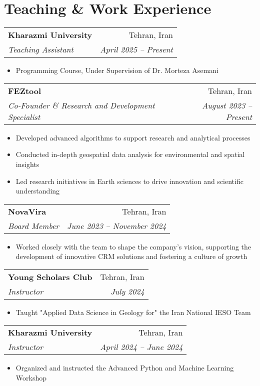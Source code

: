 \documentclass[letterpaper,11pt]{article}
\makeatletter
\newcommand{\resitem}[1]{\item #1 \vspace{-2pt}}
\newcommand{\ressubheading}[4]{
	\begin{tabular*}{6.5in}{l@{\cftdotfill{\cftsecdotsep}\extracolsep{\fill}}r}
		\textbf{#1} & #2 \\
		\textit{#3} & \textit{#4} \\
	\end{tabular*}\vspace{-8pt}
}
\makeatother
\begin{document}
	
	\section{Teaching \& Work Experience}
	\ressubheading{Kharazmi University}{Tehran, Iran}{Teaching Assistant}{April 2025 – Present}
	\begin{itemize}[topsep=7.5pt,partopsep=0pt,itemsep=3.5pt,parsep=0pt]
		\resitem{Programming Course, Under Supervision of Dr. Morteza Asemani}
	\end{itemize}
		\vspace{-0.50em} 
	\ressubheading{FEZtool}{Tehran, Iran}{Co-Founder \& Research and Development Specialist}{August 2023 – Present}
	\begin{itemize}[topsep=7.5pt,partopsep=0pt,itemsep=3.5pt,parsep=0pt]
		\resitem{Developed advanced algorithms to support research and analytical processes}
		\resitem{Conducted in-depth geospatial data analysis for environmental and spatial insights}
		\resitem{Led research initiatives in Earth sciences to drive innovation and scientific understanding}
	\end{itemize}
		\vspace{-0.50em} 
	\ressubheading{NovaVira}{Tehran, Iran}{Board Member}{June 2023 – November 2024}
    \begin{itemize}[topsep=7.5pt,partopsep=0pt,itemsep=3.5pt,parsep=0pt]
	\resitem{Worked closely with the team to shape the company’s vision, supporting the development of innovative CRM solutions and fostering a culture of growth}
    \end{itemize}
		\vspace{-0.50em} 
	\ressubheading{Young Scholars Club}{Tehran, Iran}{Instructor}{July 2024}
	\begin{itemize}[topsep=7.5pt,partopsep=0pt,itemsep=3.5pt,parsep=0pt]
		\resitem{Taught "Applied Data Science in Geology for" the Iran National IESO\footnotemark[1] 2024 Team}
	\end{itemize}
		\vspace{-0.50em} 
	\ressubheading{Kharazmi University}{Tehran, Iran}{Instructor}{April 2024 – June 2024}
	\begin{itemize}[topsep=7.5pt,partopsep=0pt,itemsep=3.5pt,parsep=0pt]
		\resitem{Organized and instructed the Advanced Python and Machine Learning Workshop}
	\end{itemize}
		\vspace{-0.50em} 
\end{document}
